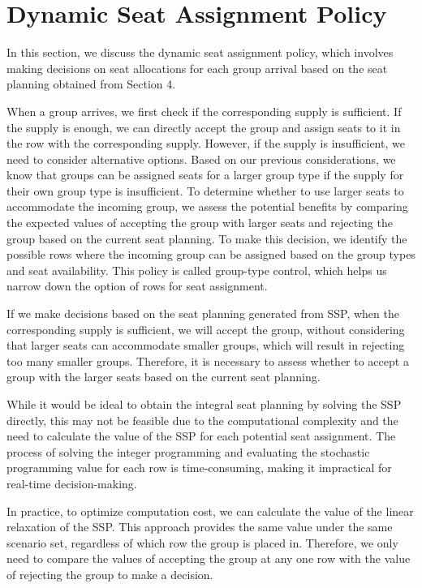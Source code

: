 \section{Dynamic Seat Assignment Policy}
In this section, we discuss the dynamic seat assignment policy, which involves making decisions on seat allocations for each group arrival based on the seat planning obtained from Section 4.

When a group arrives, we first check if the corresponding supply is sufficient. If the supply is enough, we can directly accept the group and assign seats to it in the row with the corresponding supply. However, if the supply is insufficient, we need to consider alternative options. Based on our previous considerations, we know that groups can be assigned seats for a larger group type if the supply for their own group type is insufficient. To determine whether to use larger seats to accommodate the incoming group, we assess the potential benefits by comparing the expected values of accepting the group with larger seats and rejecting the group based on the current seat planning.
To make this decision, we identify the possible rows where the incoming group can be assigned based on the group types and seat availability. This policy is called group-type control, which helps us narrow down the option of rows for seat assignment.

If we make decisions based on the seat planning generated from SSP, when the corresponding supply is sufficient, we will accept the group, without considering that larger seats can accommodate smaller groups, which will result in rejecting too many smaller groups. Therefore, it is necessary to assess whether to accept a group with the larger seats based on the current seat planning. 

While it would be ideal to obtain the integral seat planning by solving the SSP directly, this may not be feasible due to the computational complexity and the need to calculate the value of the SSP for each potential seat assignment. The process of solving the integer programming and evaluating the stochastic programming value for each row is time-consuming, making it impractical for real-time decision-making.

In practice, to optimize computation cost, we can calculate the value of the linear relaxation of the SSP. This approach provides the same value under the same scenario set, regardless of which row the group is placed in. Therefore, we only need to compare the values of accepting the group at any one row with the value of rejecting the group to make a decision.

